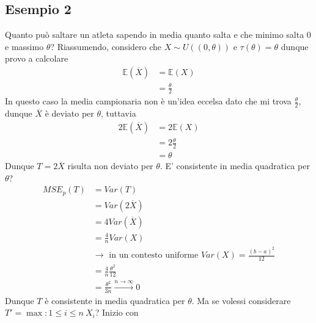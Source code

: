 \documentclass[11pt]{report}
\begin{document}
\subsection{Esempio 2}
Quanto può saltare un atleta sapendo in media quanto salta e che minimo salta 0 e massimo $\theta$? Riassumendo, considero che $X \sim U((0, \theta))$ e $\tau(\theta) = \theta$ dunque provo a calcolare
\begin{equation}
	\begin{split}
		\mathbb{E}(\overline{X}) & = \mathbb{E}(X)\\
		& = \frac{\theta}{2}
	\end{split}
\end{equation}
In questo caso la media campionaria non è un'idea eccelsa dato che mi trova $\frac{\theta}{2}$, dunque $\overline{X}$ è deviato per $\theta$, tuttavia
\begin{equation}
	\begin{split}
		2 \mathbb{E}(\overline{X}) & = 2 \mathbb{E}(X)\\
		& = 2 \frac{\theta}{2}\\
		& = \theta
	\end{split}
\end{equation}
Dunque $T = 2 \overline{X}$ risulta non deviato per $\theta$. E' consistente in media quadratica per $\theta$?
\begin{equation}
    \begin{split}
        MSE_p(T) & = Var(T)\\
        & = Var(2 \overline{X})\\
        & = 4 Var(\overline{X})\\
        & = \frac{4}{n} Var(X)\\
        & \rightarrow \text{ in un contesto uniforme } Var(X) = \frac{(b-a)^2}{12}\\
        & = \frac{4}{n} \frac{\theta^2}{12}\\
        & = \frac{\theta^2}{3n} \overset{n\rightarrow\infty}{\rightarrow} 0
    \end{split}
\end{equation}
Dunque $T$ è consistente in media quadratica per $\theta$. Ma se volessi considerare $T' = \max:{1 \leq i \leq n}\ X_i$?
Inizio con
\end{document}
